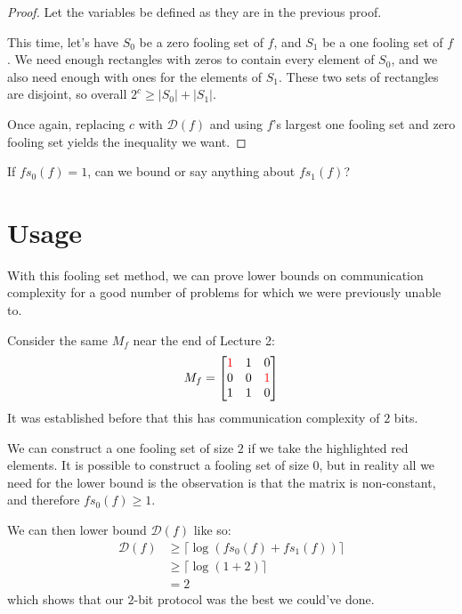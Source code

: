 \documentclass[letterpaper]{article}
\begin{document}
\begin{proof}
    Let the variables be defined as they are in the previous proof.

    This time, let's have $S_0$ be a zero fooling set of $f$, and $S_1$ be a one fooling set of $f$.
    We need enough rectangles with zeros to contain every element of $S_0$,
    and we also need enough with ones for the elements of $S_1$.
    These two sets of rectangles are disjoint, so overall $2^c \ge |S_0|+|S_1|$.

    Once again, replacing $c$ with $\mathcal{D}(f)$ and using $f$'s largest
    one fooling set and zero fooling set yields the inequality we want.
\end{proof}

\begin{problem}
If $fs_0(f)=1$, can we bound or say anything about $fs_1(f)$?
\end{problem}

\section{Usage}

With this fooling set method, we can prove lower bounds on communication
complexity for a good number of problems for which we were previously unable to.

\begin{example}
    Consider the same $M_f$ near the end of Lecture 2:
    \[M_f=\begin{bmatrix}
            \color{red}{1} & 1 & 0              \\
            0              & 0 & \color{red}{1} \\
            1              & 1 & 0
        \end{bmatrix}\]
    It was established before that this has communication complexity of $2$ bits.

    We can construct a one fooling set of size $2$ if we take the highlighted red elements.
    It is possible to construct a fooling set of size $0$, but in reality
    all we need for the lower bound is the observation is that the matrix is
    non-constant, and therefore $fs_0(f) \ge 1$.

    We can then lower bound $\mathcal{D}(f)$ like so:
    \begin{align*}
        \mathcal{D}(f)
         & \ge \lceil\log (fs_0(f)+fs_1(f))\rceil \\
         & \ge \lceil\log (1 + 2)\rceil           \\
         & = 2
    \end{align*}
    which shows that our $2$-bit protocol was the best we could've done.
\end{example}
\end{document}
